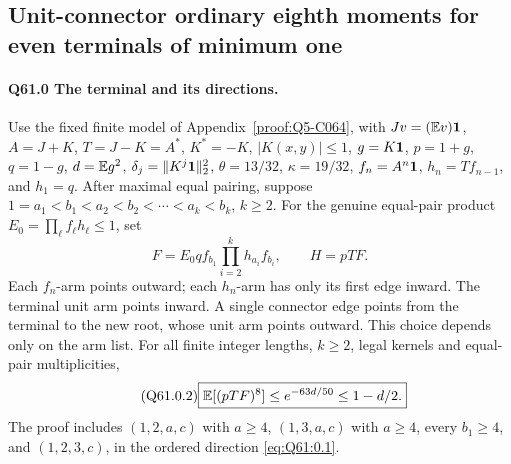 \subsection{Unit-connector ordinary eighth moments for even terminals of minimum one}\label{proof:Q5-C061}

\paragraph{Q61.0 The terminal and its directions.}
Use the fixed finite model of Appendix~\ref{proof:Q5-C064}, with
\(Jv=\allowbreak (\mathbb E v)\mathbf1\), \(A=\allowbreak J+K\), \(T=\allowbreak J-K=\allowbreak A^*\), \(K^*=\allowbreak -K\),
\(|K(x,\allowbreak y)|\le\allowbreak 1\), \(g=\allowbreak K\mathbf1\), \(p=\allowbreak 1+g\), \(q=\allowbreak 1-g\),
\(d=\allowbreak \mathbb E g^2\), \(\delta_j=\allowbreak \|K^j\mathbf1\|_2^2\),
\(\theta=\allowbreak 13/32\), \(\kappa=\allowbreak 19/32\), \(f_n=\allowbreak A^n\mathbf1\),
\(h_n=\allowbreak Tf_{n-1}\), and \(h_1=\allowbreak q\).
After maximal equal pairing, suppose
\(1=\allowbreak a_1<\allowbreak b_1<\allowbreak a_2<\allowbreak b_2<\allowbreak \cdots<\allowbreak a_k<\allowbreak b_k\), \(k\ge\allowbreak 2\).
For the genuine equal-pair product \(E_0=\allowbreak \prod_\ell f_\ell h_\ell\le\allowbreak 1\), set
\begin{equation}\tag{Q61.0.1}\label{eq:Q61:0.1}
\boxed{F=E_0qf_{b_1}\prod_{i=2}^kh_{a_i}f_{b_i},\qquad H=pTF.}
\end{equation}
Each \(f_n\)-arm points outward; each \(h_n\)-arm has only its first
edge inward. The terminal unit arm points inward. A single connector
edge points from the terminal to the new root, whose unit arm points
outward. This choice depends only on the arm list. For all finite
integer lengths, \(k\ge\allowbreak 2\), legal kernels and equal-pair multiplicities,
\begin{equation}\tag{Q61.0.2}\label{eq:Q61:0.2}
\boxed{\mathbb E[(pTF)^8]\le e^{-63d/50}\le1-d/2.}
\end{equation}
The proof includes \((1,\allowbreak 2,\allowbreak a,\allowbreak c)\) with \(a\ge\allowbreak 4\), \((1,\allowbreak 3,\allowbreak a,\allowbreak c)\) with
\(a\ge\allowbreak 4\), every \(b_1\ge\allowbreak 4\), and \((1,\allowbreak 2,\allowbreak 3,\allowbreak c)\), in the ordered
direction \eqref{eq:Q61:0.1}.

